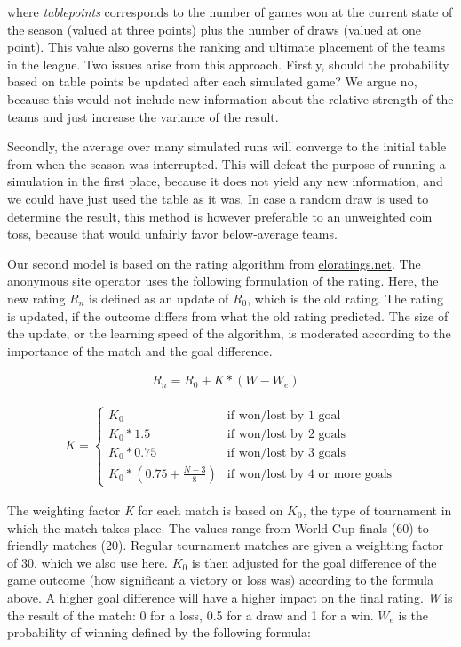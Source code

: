 \documentclass[12pt,a4paper]{article}
\begin{document}
where \emph{tablepoints} corresponds to the number of games won at the
current state of the season (valued at three points) plus the number of
draws (valued at one point). This value also governs the ranking and
ultimate placement of the teams in the league. Two issues arise from
this approach. Firstly, should the probability based on table points be
updated after each simulated game? We argue no, because this would not
include new information about the relative strength of the teams and
just increase the variance of the result.

Secondly, the average over many simulated runs will converge to the
initial table from when the season was interrupted. This will defeat the
purpose of running a simulation in the first place, because it does not
yield any new information, and we could have just used the table as it
was. In case a random draw is used to determine the result, this method
is however preferable to an unweighted coin toss, because that would
unfairly favor below-average teams.

Our second model is based on the rating algorithm from
\href{eloratings.net/about}{eloratings.net}. The anonymous site operator
uses the following formulation of the rating. Here, the new rating
\(R_n\) is defined as an update of \(R_0\), which is the old rating. The
rating is updated, if the outcome differs from what the old rating
predicted. The size of the update, or the learning speed of the
algorithm, is moderated according to the importance of the match and the
goal difference.

\begin{align}
R_n = R_0 + K * (W - W_e) &
\end{align}

\begin{align}
K = \begin{cases}
    K_0         &\mbox{if won/lost by 1 goal} \\
    K_0 * 1.5   &\mbox{if won/lost by 2 goals} \\
    K_0 * 0.75  &\mbox{if won/lost by 3 goals} \\
    K_0 * \left( 0.75 + \frac{N-3}{8} \right) &\mbox{if won/lost by 4 or more goals}
  \end{cases}
\end{align}

The weighting factor \emph{K} for each match is based on \(K_0\), the
type of tournament in which the match takes place. The values range from
World Cup finals (60) to friendly matches (20). Regular tournament
matches are given a weighting factor of 30, which we also use here.
\(K_0\) is then adjusted for the goal difference of the game outcome
(how significant a victory or loss was) according to the formula above.
A higher goal difference will have a higher impact on the final rating.
\emph{W} is the result of the match: 0 for a loss, 0.5 for a draw and 1
for a win. \(W_e\) is the probability of winning defined by the
following formula:
\end{document}
